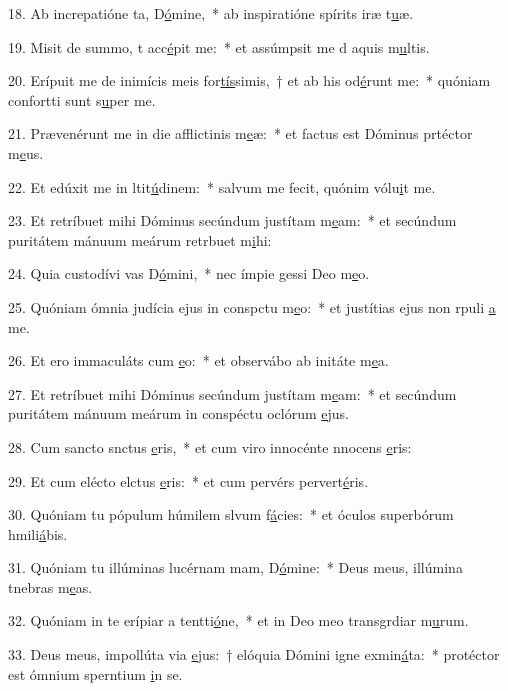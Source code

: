 18. Ab increpatióne ta, D\uline{ó}mine,~* ab inspiratióne spírits iræ t\uline{u}æ.\par 
19. Misit de summo, t acc\uline{é}pit me:~* et assúmpsit me d aquis m\uline{u}ltis.\par 
20. Erípuit me de inimícis meis for\uline{tís}simis,~† et ab his  od\uline{é}runt me:~* quóniam confortti sunt s\uline{u}per me.\par 
21. Prævenérunt me in die afflictinis m\uline{e}æ:~* et factus est Dóminus prtéctor m\uline{e}us.\par 
22. Et edúxit me in ltit\uline{ú}dinem:~* salvum me fecit, quónim vólu\uline{i}t me.\par 
23. Et retríbuet mihi Dóminus secúndum justítam m\uline{e}am:~* et secúndum puritátem mánuum meárum retrbuet m\uline{i}hi:\par 
24. Quia custodívi vas D\uline{ó}mini,~* nec ímpie gessi  Deo m\uline{e}o.\par 
25. Quóniam ómnia judícia ejus in conspctu m\uline{e}o:~* et justítias ejus non rpuli \uline{a} me.\par 
26. Et ero immaculáts cum \uline{e}o:~* et observábo ab initáte m\uline{e}a.\par 
27. Et retríbuet mihi Dóminus secúndum justítam m\uline{e}am:~* et secúndum puritátem mánuum meárum in conspéctu oclórum \uline{e}jus.\par 
28. Cum sancto snctus \uline{e}ris,~* et cum viro innocénte nnocens \uline{e}ris:\par 
29. Et cum elécto elctus \uline{e}ris:~* et cum pervérs pervert\uline{é}ris.\par 
30. Quóniam tu pópulum húmilem slvum f\uline{á}cies:~* et óculos superbórum hmili\uline{á}bis.\par 
31. Quóniam tu illúminas lucérnam mam, D\uline{ó}mine:~* Deus meus, illúmina tnebras m\uline{e}as.\par 
32. Quóniam in te erípiar a tentti\uline{ó}ne,~* et in Deo meo transgrdiar m\uline{u}rum.\par 
33. Deus meus, impollúta via \uline{e}jus:~† elóquia Dómini igne exmin\uline{á}ta:~* protéctor est ómnium sperntium \uline{i}n se.\par 
